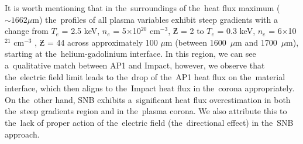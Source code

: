 It is worth mentioning that in the~surroundings of the~heat flux maximum 
($\sim 1662 \mu$m) the~profiles of all plasma variables exhibit steep gradients 
with a change from $T_e$ = 2.5 keV, $n_e$ = 5$\times$10$^{20}$ cm$^{−3}$, 
$\Zbar$ = 2 to $T_e$ = 0.3 keV, $n_e$ = 6$\times$10$^{21}$ cm$^{−3}$ , 
$\Zbar$ = 44 across approximately 100 $\mu$m 
(between 1600~$\mu$m and 1700~$\mu$m), starting at the~helium-gadolinium 
interface.  
In this region, we can see a~qualitative match between AP1 and Impact, however,
we observe that the~electric field limit  leads to 
the~drop of the~AP1 heat flux on the~material interface, which then aligns to 
the~Impact heat flux in the~corona appropriately. On the~other hand, 
SNB exhibits a~significant heat flux overestimation in both
the~steep gradients region and in the~plasma corona. We also attribute this
to the~lack of proper action of the~electric field (the~directional effect) 
in the~SNB approach.

%
